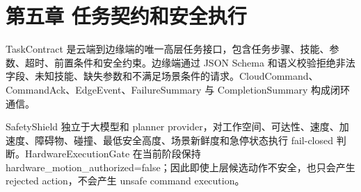 \chapter{第五章 任务契约和安全执行}

TaskContract 是云端到边缘端的唯一高层任务接口，包含任务步骤、技能、参数、超时、前置条件和安全约束。边缘端通过 JSON Schema 和语义校验拒绝非法字段、未知技能、缺失参数和不满足场景条件的请求。CloudCommand、CommandAck、EdgeEvent、FailureSummary 与 CompletionSummary 构成闭环通信。\par

SafetyShield 独立于大模型和 planner provider，对工作空间、可达性、速度、加速度、障碍物、碰撞、最低安全高度、场景新鲜度和急停状态执行 fail-closed 判断。HardwareExecutionGate 在当前阶段保持 hardware\_motion\_authorized=false；因此即使上层候选动作不安全，也只会产生 rejected action，不会产生 unsafe command execution。\par
